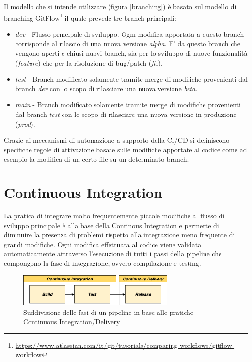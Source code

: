 Il modello che si intende utilizzare (figura \ref{branching}) è basato sul modello di branching GitFlow\footnote{\url{https://www.atlassian.com/it/git/tutorials/comparing-workflows/gitflow-workflow}} il quale prevede tre branch principali:
\begin{itemize}
    \item \textit{dev} - Flusso principale di sviluppo. Ogni modifica apportata a questo branch corrisponde al rilascio di una nuova versione \textit{alpha}. E' da questo branch che vengono aperti e chiusi nuovi branch, sia per lo sviluppo di nuove funzionalità (\textit{feature}) che per la risoluzione di bug/patch (\textit{fix}).
    \item \textit{test} - Branch modificato solamente tramite merge di modifiche provenienti dal branch \textit{dev} con lo scopo di rilasciare una nuova versione \textit{beta}.
    \item \textit{main} - Branch modificato solamente tramite merge di modifiche provenienti dal branch \textit{test} con lo scopo di rilasciare una nuova versione in produzione (\textit{prod}).
\end{itemize}

Grazie ai meccanismi di automazione a supporto della CI/CD si definiscono specifiche regole di attivazione basate sulle modifiche apportate al codice come ad esempio la modifica di un certo file su un determinato branch.

\section{Continuous Integration}
La pratica di integrare molto frequentemente piccole modifiche al flusso di sviluppo principale è alla base della Continous Integration e permette di diminuire la presenza di problemi rispetto alla integrazione meno frequente di grandi modifiche. Ogni modifica effettuata al codice viene validata automaticamente attraverso l'esecuzione di tutti i passi della pipeline che compongono la fase di integrazione, ovvero compilazione e testing.

\begin{figure}[H]
\centering
\includegraphics[width=0.7\textwidth]{img/tesi-29-cicd.drawio.png}
\caption{Suddivisione delle fasi di un pipeline in base alle pratiche Continuous Integration/Delivery}
\end{figure}

